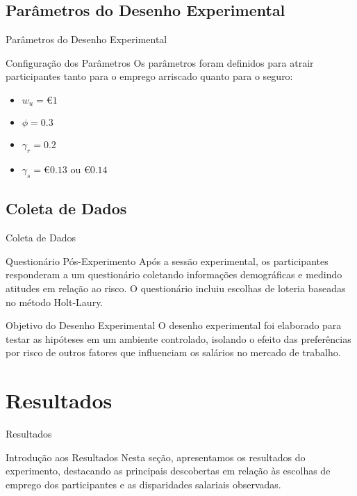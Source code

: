 \documentclass[aspectratio=169, xcolor={dvipsnames}, 10pt, brazil]{beamer}
\begin{document}
\subsection{Parâmetros do Desenho Experimental}
\begin{frame}{Parâmetros do Desenho Experimental}

    \begin{block}{Configuração dos Parâmetros}
        Os parâmetros foram definidos para atrair participantes tanto para o emprego arriscado quanto para o seguro:
        \begin{itemize}
            \item \( w_u = €1 \)
            \item \( \phi = 0.3 \)
            \item \( \gamma_r = 0.2 \)
            \item \( \gamma_s = €0.13 \) ou \( €0.14 \)
        \end{itemize}
    \end{block}

\end{frame}

\subsection{Coleta de Dados}
\begin{frame}{Coleta de Dados}

    \begin{block}{Questionário Pós-Experimento}
        Após a sessão experimental, os participantes responderam a um questionário coletando informações demográficas e medindo atitudes em relação ao risco. O questionário incluiu escolhas de loteria baseadas no método Holt-Laury.
    \end{block}

    \begin{block}{Objetivo do Desenho Experimental}
        O desenho experimental foi elaborado para testar as hipóteses em um ambiente controlado, isolando o efeito das preferências por risco de outros fatores que influenciam os salários no mercado de trabalho.
    \end{block}

\end{frame}

\section{Resultados}
\begin{frame}{Resultados}

    \begin{block}{Introdução aos Resultados}
        Nesta seção, apresentamos os resultados do experimento, destacando as principais descobertas em relação às escolhas de emprego dos participantes e as disparidades salariais observadas.
    \end{block}

\end{frame}
\end{document}
